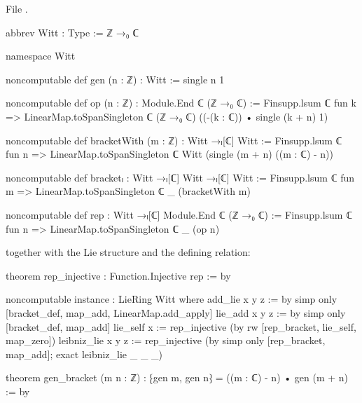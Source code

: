 File .
\begin{leancode}
abbrev Witt : Type := ℤ →₀ ℂ

namespace Witt

noncomputable def gen (n : ℤ) : Witt := single n 1

noncomputable def op (n : ℤ) : Module.End ℂ (ℤ →₀ ℂ) :=
  Finsupp.lsum ℂ fun k => LinearMap.toSpanSingleton ℂ (ℤ →₀ ℂ) ((-(k : ℂ)) • single (k + n) 1)

noncomputable def bracketWith (m : ℤ) : Witt →ₗ[ℂ] Witt :=
  Finsupp.lsum ℂ fun n => LinearMap.toSpanSingleton ℂ Witt (single (m + n) ((m : ℂ) - n))

noncomputable def bracketₗ : Witt →ₗ[ℂ] Witt →ₗ[ℂ] Witt :=
  Finsupp.lsum ℂ fun m => LinearMap.toSpanSingleton ℂ _ (bracketWith m)

noncomputable def rep : Witt →ₗ[ℂ] Module.End ℂ (ℤ →₀ ℂ) :=
  Finsupp.lsum ℂ fun n => LinearMap.toSpanSingleton ℂ _ (op n)
\end{leancode}
together with the Lie structure and the defining relation:
\begin{leancode}
theorem rep_injective : Function.Injective rep := by

noncomputable instance : LieRing Witt where
  add_lie x y z := by simp only [bracket_def, map_add, LinearMap.add_apply]
  lie_add x y z := by simp only [bracket_def, map_add]
  lie_self x := rep_injective (by rw [rep_bracket, lie_self, map_zero])
  leibniz_lie x y z := rep_injective (by simp only [rep_bracket, map_add]; exact leibniz_lie _ _ _)

theorem gen_bracket (m n : ℤ) : ⁅gen m, gen n⁆ = ((m : ℂ) - n) • gen (m + n) := by
\end{leancode}

